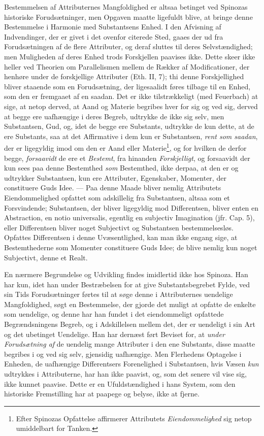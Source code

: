 \documentclass[12pt,a4paper]{book}
\newcommand{\opage}[1]{\marginnote{\footnotesize\textit{[#1]}}}
\begin{document}
Bestemmelsen af Attributernes Mangfoldighed er altsaa betinget ved
Spinozas historiske Forudsætninger, men Opgaven maatte ligefuldt blive,
at bringe denne Bestemmelse i Harmonie med Substantsens Enhed. I den
Afvisning af Indvendinger, der er givet i det ovenfor citerede Sted,
gaaes der ud fra Forudsætningen af de flere Attributer, og deraf
sluttes til deres Selvstændighed; men Muligheden af deres Enhed trods
Forskjellen paavises ikke. Dette skeer ikke heller ved Theorien om
Parallelismen mellem de Rækker af Modificationer, der henhøre under de
forskjellige Attributer (Eth. II, 7); thi denne Forskjellighed bliver
staaende som en Forudsætning, der ligesaalidt føres tilbage til en
Enhed, som den er fremgaaet af en saadan. Det er ikke tilstrækkeligt
(med Feuerbach) at sige, at netop derved, at Aand og Materie begribes
hver for sig og ved sig, derved at begge ere uafhængige i deres Begreb,
udtrykke de ikke sig selv, men Substantsen, Gud, og, idet de begge ere
Substants, udtrykke de kun dette, at de ere Substants, saa at det
Affirmative i dem kun er Substantsen, \emph{rent som saadan}, der er
ligegyldig imod om den er Aand eller Materie\footnote{Efter Spinozas
Opfattelse affirmerer Attributets \emph{Eiendommelighed} sig netop umiddelbart
for Tanken.}, og for hvilken de derfor begge, \emph{forsaavidt} de ere
et \emph{Bestemt}, fra hinanden \emph{Forskjelligt}, og
forsaavidt der kun sees paa denne Bestemthed \emph{som} Bestemthed,
ikke derpaa, at den er og udtrykker Substantsen, kun ere Attributer,
Egenskaber, Momenter, der constituere Guds Idee. --- Paa denne Maade
bliver nemlig Attributets Eiendommelighed opfattet som adskillelig fra
Substantsen, altsaa som et Forsvindende; Substantsen, der bliver
ligegyldig mod Differentsen, bliver enten en Abstraction, en notio
universalis,
\opage{53} egentlig en subjectiv Imagination (jfr. Cap. 5), eller Differentsen
bliver noget Subjectivt og Substantsen bestemmelsesløs. Opfattes
Differentsen i denne Uvæsentlighed, kan man ikke engang sige, at
Bestemthederne som Momenter constituere Guds Idee; de blive nemlig kun
noget Subjectivt, denne et Realt.

En nærmere Begrundelse og Udvikling findes imidlertid ikke hos Spinoza.
Han har kun, idet han under Bestræbelsen for at give Substantsbegrebet
Fylde, ved sin Tids Forudsætninger førtes til at søge denne i
Attributernes uendelige Mangfoldighed, søgt en Bestemmelse, der gjorde
det muligt at opfatte de enkelte som uendelige, og denne har han
fundet i det eiendommeligt opfattede Begrændsningens Begreb, og i
Adskillelsen mellem det, der er uendeligt i sin Art og det ubetinget
Uendelige. Han har dernæst ført Beviset for, at \emph{under
Forudsætning af} de uendelig mange Attributer i den ene Substants,
disse maatte begribes i og ved sig selv, gjensidig uafhængige. Men
Flerhedens Optagelse i Enheden, de uafhængige Differentsers
Forenelighed i Substantsen, hvis Væsen \emph{kun} udtrykkes i Attributerne,
har han ikke paavist, og, som det senere vil vise sig, ikke kunnet
paavise. Dette er en Ufuldstændighed i hans System, som den historiske
Fremstilling har at paapege og belyse, ikke at fjerne.
\end{document}
